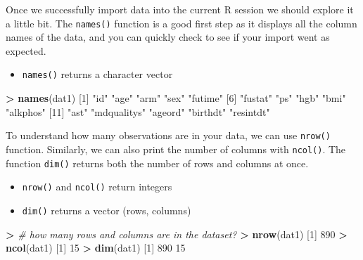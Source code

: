 \documentclass[
]{book}
\newenvironment{Shaded}{\begin{snugshade}}{\end{snugshade}}
\newcommand{\CommentTok}[1]{\textcolor[rgb]{0.56,0.35,0.01}{\textit{#1}}}
\newcommand{\DecValTok}[1]{\textcolor[rgb]{0.00,0.00,0.81}{#1}}
\newcommand{\ErrorTok}[1]{\textcolor[rgb]{0.64,0.00,0.00}{\textbf{#1}}}
\newcommand{\KeywordTok}[1]{\textcolor[rgb]{0.13,0.29,0.53}{\textbf{#1}}}
\newcommand{\NormalTok}[1]{#1}
\newcommand{\OperatorTok}[1]{\textcolor[rgb]{0.81,0.36,0.00}{\textbf{#1}}}
\newcommand{\StringTok}[1]{\textcolor[rgb]{0.31,0.60,0.02}{#1}}
\providecommand{\tightlist}{%
  \setlength{\itemsep}{0pt}\setlength{\parskip}{0pt}}
\begin{document}
Once we successfully import data into the current R session we should explore it a little bit. The \texttt{names()} function is a good first step as it displays all the column names of the data, and you can quickly check to see if your import went as expected.

\begin{itemize}
\tightlist
\item
  \texttt{names()} returns a character vector
\end{itemize}

\begin{Shaded}
\begin{Highlighting}[]
\OperatorTok{>}\StringTok{ }\KeywordTok{names}\NormalTok{(dat1)}
\NormalTok{ [}\DecValTok{1}\NormalTok{] }\StringTok{"id"}         \StringTok{"age"}        \StringTok{"arm"}        \StringTok{"sex"}        \StringTok{"futime"}    
\NormalTok{ [}\DecValTok{6}\NormalTok{] }\StringTok{"fustat"}     \StringTok{"ps"}         \StringTok{"hgb"}        \StringTok{"bmi"}        \StringTok{"alkphos"}   
\NormalTok{[}\DecValTok{11}\NormalTok{] }\StringTok{"ast"}        \StringTok{"mdqualitys"} \StringTok{"ageord"}     \StringTok{"birthdt"}    \StringTok{"resintdt"}  
\end{Highlighting}
\end{Shaded}

To understand how many observations are in your data, we can use \texttt{nrow()} function. Similarly, we can also print the number of columns with \texttt{ncol()}. The function \texttt{dim()} returns both the number of rows and columns at once.

\begin{itemize}
\tightlist
\item
  \texttt{nrow()} and \texttt{ncol()} return integers
\item
  \texttt{dim()} returns a vector (rows, columns)
\end{itemize}

\begin{Shaded}
\begin{Highlighting}[]
\OperatorTok{>}\StringTok{ }\CommentTok{# how many rows and columns are in the dataset?}
\ErrorTok{>}\StringTok{ }\KeywordTok{nrow}\NormalTok{(dat1)}
\NormalTok{[}\DecValTok{1}\NormalTok{] }\DecValTok{890}
\OperatorTok{>}\StringTok{ }\KeywordTok{ncol}\NormalTok{(dat1)}
\NormalTok{[}\DecValTok{1}\NormalTok{] }\DecValTok{15}
\OperatorTok{>}\StringTok{ }\KeywordTok{dim}\NormalTok{(dat1)}
\NormalTok{[}\DecValTok{1}\NormalTok{] }\DecValTok{890}  \DecValTok{15}
\end{Highlighting}
\end{Shaded}
\end{document}
